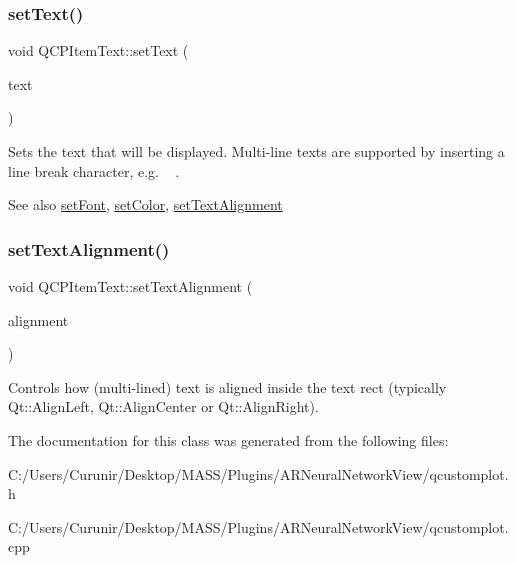 \subsubsection{\texorpdfstring{set\+Text()}{setText()}}
{\footnotesize\ttfamily void Q\+C\+P\+Item\+Text\+::set\+Text (\begin{DoxyParamCaption}\item[{const Q\+String \&}]{text }\end{DoxyParamCaption})}

Sets the text that will be displayed. Multi-\/line texts are supported by inserting a line break character, e.\+g. \textquotesingle{}~\newline
\textquotesingle{}.

\begin{DoxySeeAlso}{See also}
\hyperlink{class_q_c_p_item_text_a94ad60ebe04f5c07c35e7c2029e96b1f}{set\+Font}, \hyperlink{class_q_c_p_item_text_aa51efc0841fe52da9eaf8aff6fc8a8b2}{set\+Color}, \hyperlink{class_q_c_p_item_text_ab5bc0684c4d1bed81949a11b34dba478}{set\+Text\+Alignment} 
\end{DoxySeeAlso}
\mbox{\label{class_q_c_p_item_text_ab5bc0684c4d1bed81949a11b34dba478}} 
\subsubsection{\texorpdfstring{set\+Text\+Alignment()}{setTextAlignment()}}
{\footnotesize\ttfamily void Q\+C\+P\+Item\+Text\+::set\+Text\+Alignment (\begin{DoxyParamCaption}\item[{Qt\+::\+Alignment}]{alignment }\end{DoxyParamCaption})}

Controls how (multi-\/lined) text is aligned inside the text rect (typically Qt\+::\+Align\+Left, Qt\+::\+Align\+Center or Qt\+::\+Align\+Right). 

The documentation for this class was generated from the following files\+:\begin{DoxyCompactItemize}
\item 
C\+:/\+Users/\+Curunir/\+Desktop/\+M\+A\+S\+S/\+Plugins/\+A\+R\+Neural\+Network\+View/qcustomplot.\+h\item 
C\+:/\+Users/\+Curunir/\+Desktop/\+M\+A\+S\+S/\+Plugins/\+A\+R\+Neural\+Network\+View/qcustomplot.\+cpp\end{DoxyCompactItemize}
